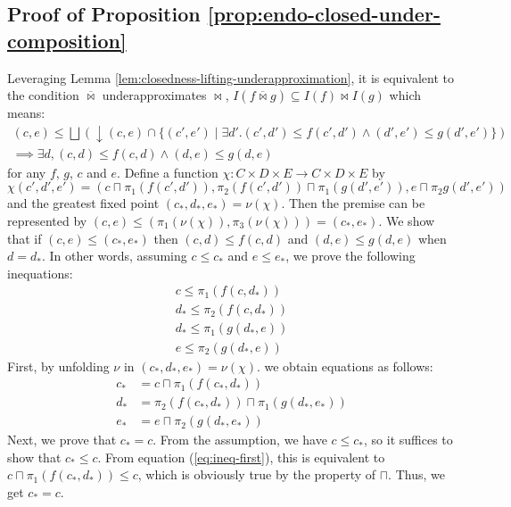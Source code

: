 \documentclass{llncs}
\newcommand{\bigjoin}{\bigsqcup}
\newcommand{\meet}{\sqcap}
\newcommand{\bowtielift}{\mathbin{\overline{\bowtie}}}
\begin{document}
\subsection{Proof of Proposition \ref{prop:endo-closed-under-composition}}
Leveraging Lemma \ref{lem:closedness-lifting-underapproximation}, it is equivalent to the condition $\bowtielift$ underapproximates $\bowtie$, $I(f \bowtielift g) \subseteq I(f) \bowtie I(g)$ which means:
\begin{align*}
  (c, e) \leq \bigjoin (\downarrow (c , e) \cap \{(c', e') \mid \exists d'. (c' , d') \leq f (c' , d') \land (d' , e') \leq g (d' , e') \}) \\
  \implies \exists d , (c, d) \leq f (c , d) \land (d, e) \leq g (d, e)
\end{align*} for any $f$, $g$, $c$ and $e$.
Define a function $\chi : C \times D \times E \to C \times D \times E$ by
\[ \chi(c', d', e') = (c \meet \pi_{1} (f (c' ,d')) , \pi_{2} (f (c' , d')) \meet \pi_{1} (g (d' , e')) , e \meet \pi_{2} g (d' , e'))
\]
and the greatest fixed point $(c_{*} , d_{*} , e_{*}) = \nu(\chi)$.
Then the premise can be represented by $(c , e) \leq (\pi_{1}(\nu(\chi)) , \pi_{3}(\nu(\chi))) = (c_{*} , e_{*})$.
We show that if $(c , e) \leq (c_{*} , e_{*})$ then $(c, d) \leq f (c , d)$ and $(d, e) \leq g (d, e)$ when $d = d_{*}$. In other words, assuming $c \leq c_{*}$ and $e \leq e_{*}$, we prove the following inequations:
\begin{align}
  \label{enum:c} c \leq \pi_{1} (f (c , d_{*})) \\
  \label{enum:f} d_{*} \leq \pi_{2} (f (c , d_{*})) \\
  \label{enum:g} d_{*} \leq \pi_{1} (g (d_{*} , e)) \\
  \label{enum:e} e \leq \pi_{2} (g (d_{*} , e))
\end{align}
First, by unfolding $\nu$ in $(c_{*} , d_{*}, e_{*}) = \nu(\chi)$. we obtain equations as follows:
\begin{align}
c_{*} &= c \meet \pi_{1}( f (c_{*} , d_{*})) \label{eq:ineq-first}\\
d_{*} &= \pi_{2}(f (c_{*} , d_{*})) \meet \pi_{1}(g (d_{*} , e_{*})) \label{eq:ineq-second} \\
e_{*} &= e \meet \pi_{2}(g (d_{*} , e_{*})) \label{eq:ineq-third}
\end{align}
Next, we prove that $c_{*} = c$. From the assumption, we have $c \leq c_{*}$, so it suffices to show that $c_{*} \leq c$. From equation (\ref{eq:ineq-first}), this is equivalent to $c \meet \pi_{1}( f (c_{*} , d_{*})) \leq c$, which is obviously true by the property of $\meet$. Thus, we get $c_{*} = c$.
\end{document}

